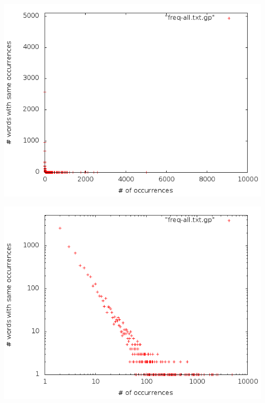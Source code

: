 \begin{frame}[c]
	\includegraphics[scale=0.4]{../task02-04/src/main/resources/results/task3/freq-lin.png}
\end{frame}

\begin{frame}[c]
	\includegraphics[scale=0.4]{../task02-04/src/main/resources/results/task3/freq-log.png} 
\end{frame}	